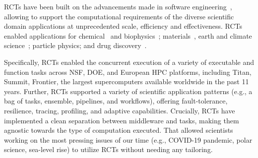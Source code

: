 \documentclass[preprint,12pt, a4paper]{elsarticle}
\begin{document}

RCTs have been built on the advancements made in software
engineering~\cite{merzky2018synapse,merzky2021design,merzky2022raptor,turilli2018comprehensive,turilli2019middleware,luckow2012p},
allowing to support the computational requirements of the diverse scientific
domain applications at unprecedented scale, efficiency and effectiveness. RCTs
enabled applications for chemical~\cite{sampat2018parallel} and
biophysics~\cite{shkurti2016coco,dakka2018high}; materials~\cite{dakka2018high},
earth and climate
science~\cite{paraskevakos2019workflow,balasubramanian2018harnessing}; particle
physics\cite{oleynik2017high}; and drug discovery~\cite{bfe-jctc-2014}.

Specifically, RCTs enabled the concurrent execution of a variety of executable
and function tasks across NSF, DOE, and European HPC platforms, including Titan,
Summit, Frontier, the largest supercomputers available worldwide in the past 11
years. Further, RCTs supported a variety of scientific application patterns
(e.g., a bag of tasks, ensemble, pipelines, and workflows), offering
fault-tolerance, resilience, tracing, profiling, and adaptive capabilities.
Crucially, RCTs have implemented a clean separation between middleware and tasks,
making them agnostic towards the type of computation executed. That allowed
scientists working on the most pressing issues of our time (e.g., COVID-19
pandemic, polar science, sea-level rise) to utilize RCTs without needing any tailoring.



\end{document}
